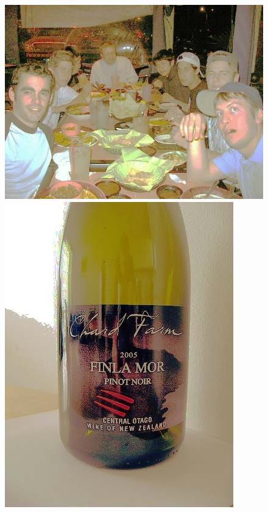 \begin{appendices}
\begin{figure}[htb]
\begin{minipage}{0.19\textwidth}
\end{minipage}
\begin{minipage}{0.19\textwidth}
\includegraphics[width=\textwidth]{images/anomalien/HS/000177.jpg}
\end{minipage}
\begin{minipage}{0.19\textwidth}
\includegraphics[width=\textwidth]{images/anomalien/HS/000344.jpg}

\end{minipage}
\end{figure}
\end{appendices}
